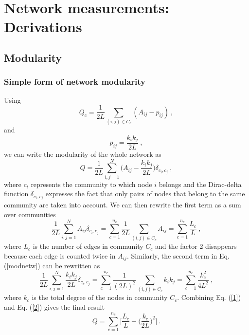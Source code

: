 \documentclass[11 pt , letterpaper , twoside , openright]{book}
\begin{document}
\newpage

\pagestyle{fancy}
\fancyhf{}
\lhead{\textcolor{NavyBlue}{\appendixname} \ \textcolor{NavyBlue}{\thechapter}}
\rhead{\rightmark}
\cfoot{\thepage}

\appendix
\addappheadtotoc 

\chapter{Network measurements: Derivations}
\section{Modularity}\label{modul}
\subsection{Simple form of network modularity}\label{simplemod}

Using \cite{Albert2016}
\begin{equation}
	Q_c = \frac{1}{2L}\sum_{(i,j) \in C_c} (A_{ij} - p_{ij}) \ ,
\end{equation}
and \cite{Albert2016}
\begin{equation}
	p_{ij} = \frac{k_ik_j}{2L} \ ,
\end{equation}
we can write the modularity of the whole network as \cite{Albert2016}
\begin{equation}\label{modnetw}
	Q = \frac{1}{2L}\sum_{i, j = 1}^N \bigg(A_{ij} - \frac{k_ik_j}{2L}\bigg) \delta_{c_i, c_j} \ ,
\end{equation}
where $c_i$ represents the community to which node $i$ belongs and the Dirac-delta function $\delta_{c_i, c_j}$ expresses the fact that only pairs of nodes that belong to the same community are taken into account. We can then rewrite the first term as a sum over communities \cite{Albert2016}
\begin{equation}\label{1}
	\frac{1}{2L}\sum_{i, j = 1}^N A_{ij}\delta_{c_i, c_j} = \sum_{c=1}^{n_c}\frac{1}{2L}\sum_{(i, j) \in C_c} A_{ij} = \sum_{c=1}^{n_c}\frac{L_c}{L} \ ,
\end{equation}
where $L_c$ is the number of edges in community $C_c$ and the factor 2 disappears because each edge is counted twice in $A_{ij}$. Similarly, the second term in Eq. (\ref{modnetw}) can be rewritten as \cite{Albert2016}
\begin{equation}\label{2}
	\frac{1}{2L}\sum_{i, j = 1}^N \frac{k_ik_j}{2L} \delta_{c_i, c_j} = \sum_{c=1}^{n_c}\frac{1}{(2L)^2}\sum_{(i, j) \in C_c} k_ik_j = \sum_{c=1}^{n_c}\frac{k_c^2}{4L^2} \ ,
\end{equation}
where $k_c$ is the total degree of the nodes in community $C_c$. Combining Eq. (\ref{1}) and Eq. (\ref{2}) gives the final result \cite{Albert2016}
\begin{equation}\label{Qfin}
	Q = \sum_{c = 1}^{n_c}\bigg[\frac{L_c}{L} - \bigg(\frac{k_c}{2L}\bigg)^2 \bigg] \ .
\end{equation}
\end{document}
